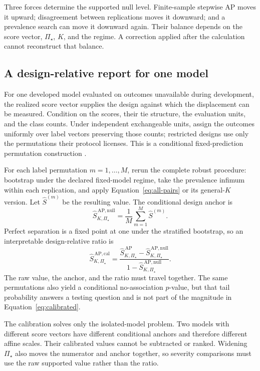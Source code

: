 \documentclass[11pt]{article}
\newcommand{\PSet}{\Pi_\star}
\newcommand{\SRobHat}{\widehat S_{K,\PSet}^{\,\mathrm{AP}}}
\newcommand{\SRobNullHat}{\widehat S_{K,\PSet}^{\,\mathrm{AP,null}}}
\newcommand{\SRobCalHat}{\widehat S_{K,\PSet}^{\,\mathrm{AP,cal}}}
\theoremstyle{remark}
\begin{document}
Three forces determine the supported null level. Finite-sample stepwise AP moves it upward; disagreement between replications moves it downward; and a prevalence search can move it downward again. Their balance depends on the score vector, $\PSet$, $K$, and the regime. A correction applied after the calculation cannot reconstruct that balance.

\subsection{A design-relative report for one model}

For one developed model evaluated on outcomes unavailable during development, the realized score vector supplies the design against which the displacement can be measured. Condition on the scores, their tie structure, the evaluation units, and the class counts. Under independent exchangeable units, assign the outcomes uniformly over label vectors preserving those counts; restricted designs use only the permutations their protocol licenses. This is a conditional fixed-prediction permutation construction \cite{ojala2010permutation}.

For each label permutation $m=1,\ldots,M$, rerun the complete robust procedure: bootstrap under the declared fixed-model regime, take the prevalence infimum within each replication, and apply Equation~\eqref{eq:all-pairs} or its general-$K$ version. Let $\widehat S^{(m)}$ be the resulting value. The conditional design anchor is
\begin{equation}
\SRobNullHat
=
\frac1M\sum_{m=1}^{M}\widehat S^{(m)}.
\label{eq:null-anchor}
\end{equation}
Perfect separation is a fixed point at one under the stratified bootstrap, so an interpretable design-relative ratio is
\begin{equation}
\SRobCalHat
=
\frac{\SRobHat-\SRobNullHat}
{1-\SRobNullHat}.
\label{eq:calibrated}
\end{equation}
The raw value, the anchor, and the ratio must travel together. The same permutations also yield a conditional no-association $p$-value, but that tail probability answers a testing question and is not part of the magnitude in Equation~\eqref{eq:calibrated}.

The calibration solves only the isolated-model problem. Two models with different score vectors have different conditional anchors and therefore different affine scales. Their calibrated values cannot be subtracted or ranked. Widening $\PSet$ also moves the numerator and anchor together, so severity comparisons must use the raw supported value rather than the ratio.
\end{document}
